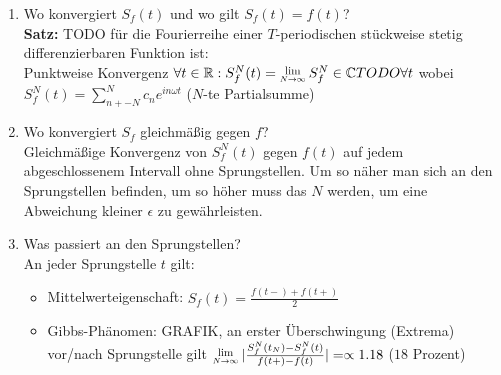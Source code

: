 \documentclass[nocolor,german]{latex4ei/latex4ei_sheet}
\newcommand{\Lim}[1]{\raisebox{0.5ex}{\scalebox{0.8}{$\displaystyle \lim_{#1    }\;$}}}
\begin{document}
\begin{enumerate}
	\item Wo konvergiert $S_f(t)$ und wo gilt $S_f(t)=f(t)$?\\
		\textbf{Satz:} TODO f\"ur die Fourierreihe einer $T$-periodischen st\"uckweise stetig differenzierbaren Funktion ist:\\
		Punktweise Konvergenz $\forall t \in \R: S_f^N(t)=\Lim{N \to \infty} S_f^N \in \C TODO \forall t$ wobei $S_f^N(t)=\sum_{n+-N}^N c_n e^{i n \omega t}$ ($N$-te Partialsumme)
	\item Wo konvergiert $S_f$ gleichm\"a\ss{}ig gegen $f$?\\
		Gleichm\"a\ss{}ige Konvergenz von $S_f^N(t)$ gegen $f(t)$ auf jedem abgeschlossenem Intervall ohne Sprungstellen. Um so n\"aher man sich an den Sprungstellen befinden, um so h\"oher muss das $N$ werden, um eine Abweichung kleiner $\epsilon$ zu gew\"ahrleisten.
	\item Was passiert an den Sprungstellen?\\
		An jeder Sprungstelle $t$ gilt:
			\begin{itemize}
				\item Mittelwerteigenschaft: $S_f(t)=\frac{f(t-)+f(t+)}{2}$
				\item Gibbs-Ph\"anomen: GRAFIK, an erster \"Uberschwingung (Extrema) vor/nach Sprungstelle gilt $\Lim{N\to \infty}|\frac{S_f^N(t_N)-S_f^N(t)}{f(t+)-f(t)}|=\propto 1.18$ ($18$ Prozent)
			\end{itemize}
\end{enumerate}
\end{document}
